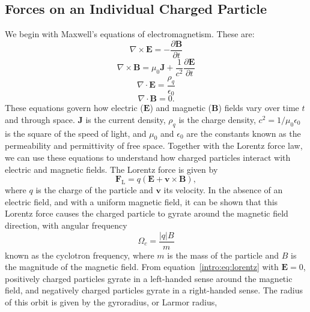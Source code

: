 \subsection{Forces on an Individual Charged Particle}\label{intro:sec:singleparticle}
We begin with Maxwell's equations of electromagnetism. These are:
\begin{equation}
\nabla \times \boldsymbol{E} = -\frac{\partial \boldsymbol{B}}{\partial t}
\end{equation}
\begin{equation}\label{intro:eq:amperemaxwell}
\nabla \times \boldsymbol{B} = \mu_0 \boldsymbol{J} + \frac{1}{c^2}\frac{\partial \boldsymbol{E}}{\partial t}
\end{equation}
\begin{equation}
\nabla \cdot \boldsymbol{E} = \frac{\rho_q}{\epsilon_0} 
\end{equation}
\begin{equation}\label{intro:eq:nomonopoles}
\nabla \cdot \boldsymbol{B} = 0.
\end{equation}
These equations govern how electric ($\boldsymbol{E}$) and magnetic ($\boldsymbol{B}$) fields vary over time $t$ and through space. $\boldsymbol{J}$ is the current density, $\rho_q$ is the charge density, $c^2 = 1/\mu_0 \epsilon_0$ is the square of the speed of light, and $\mu_0$ and $\epsilon_0$ are the constants known as the permeability and permittivity of free space. Together with the Lorentz force law, we can use these equations to understand how charged particles interact with electric and magnetic fields. The Lorentz force is given by 
\begin{equation}\label{intro:eq:lorentz}
\boldsymbol{F}_\mathrm{L} = q(\boldsymbol{E} + \boldsymbol{v} \times \boldsymbol{B}),
\end{equation}
where $q$ is the charge of the particle and $\boldsymbol{v}$ its velocity. In the absence of an electric field, and with a uniform magnetic field, it can be shown that this Lorentz force causes the charged particle to gyrate around the magnetic field direction, with angular frequency
\begin{equation}
\Omega_c = \frac{|q|B}{m}
\end{equation}
known as the cyclotron frequency, where $m$ is the mass of the particle and $B$ is the magnitude of the magnetic field. From equation~\ref{intro:eq:lorentz}  with $\boldsymbol{E}=0$, positively charged particles gyrate in a left-handed sense around the magnetic field, and negatively charged particles gyrate in a right-handed sense. The radius of this orbit is given by the gyroradius, or Larmor radius,

